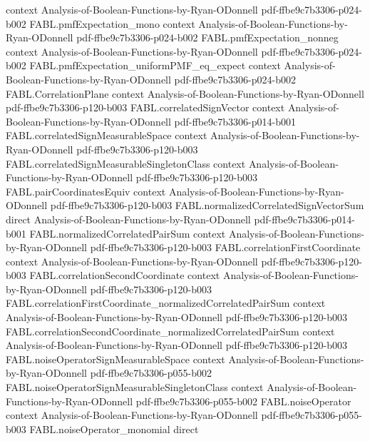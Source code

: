 \begin{theorem}
  {context}
  {Analysis-of-Boolean-Functions-by-Ryan-ODonnell}
  {pdf-ffbe9c7b3306-p024-b002}
\proofstep
  {FABL.pmfExpectation_mono}
  {context}
  {Analysis-of-Boolean-Functions-by-Ryan-ODonnell}
  {pdf-ffbe9c7b3306-p024-b002}
\proofstep
  {FABL.pmfExpectation_nonneg}
  {context}
  {Analysis-of-Boolean-Functions-by-Ryan-ODonnell}
  {pdf-ffbe9c7b3306-p024-b002}
\proofstep
  {FABL.pmfExpectation_uniformPMF_eq_expect}
  {context}
  {Analysis-of-Boolean-Functions-by-Ryan-ODonnell}
  {pdf-ffbe9c7b3306-p024-b002}
\proofstep
  {FABL.CorrelationPlane}
  {context}
  {Analysis-of-Boolean-Functions-by-Ryan-ODonnell}
  {pdf-ffbe9c7b3306-p120-b003}
\proofstep
  {FABL.correlatedSignVector}
  {context}
  {Analysis-of-Boolean-Functions-by-Ryan-ODonnell}
  {pdf-ffbe9c7b3306-p014-b001}
\proofstep
  {FABL.correlatedSignMeasurableSpace}
  {context}
  {Analysis-of-Boolean-Functions-by-Ryan-ODonnell}
  {pdf-ffbe9c7b3306-p120-b003}
\proofstep
  {FABL.correlatedSignMeasurableSingletonClass}
  {context}
  {Analysis-of-Boolean-Functions-by-Ryan-ODonnell}
  {pdf-ffbe9c7b3306-p120-b003}
\proofstep
  {FABL.pairCoordinatesEquiv}
  {context}
  {Analysis-of-Boolean-Functions-by-Ryan-ODonnell}
  {pdf-ffbe9c7b3306-p120-b003}
\proofstep
  {FABL.normalizedCorrelatedSignVectorSum}
  {direct}
  {Analysis-of-Boolean-Functions-by-Ryan-ODonnell}
  {pdf-ffbe9c7b3306-p014-b001}
\proofstep
  {FABL.normalizedCorrelatedPairSum}
  {context}
  {Analysis-of-Boolean-Functions-by-Ryan-ODonnell}
  {pdf-ffbe9c7b3306-p120-b003}
\proofstep
  {FABL.correlationFirstCoordinate}
  {context}
  {Analysis-of-Boolean-Functions-by-Ryan-ODonnell}
  {pdf-ffbe9c7b3306-p120-b003}
\proofstep
  {FABL.correlationSecondCoordinate}
  {context}
  {Analysis-of-Boolean-Functions-by-Ryan-ODonnell}
  {pdf-ffbe9c7b3306-p120-b003}
\proofstep
  {FABL.correlationFirstCoordinate_normalizedCorrelatedPairSum}
  {context}
  {Analysis-of-Boolean-Functions-by-Ryan-ODonnell}
  {pdf-ffbe9c7b3306-p120-b003}
\proofstep
  {FABL.correlationSecondCoordinate_normalizedCorrelatedPairSum}
  {context}
  {Analysis-of-Boolean-Functions-by-Ryan-ODonnell}
  {pdf-ffbe9c7b3306-p120-b003}
\proofstep
  {FABL.noiseOperatorSignMeasurableSpace}
  {context}
  {Analysis-of-Boolean-Functions-by-Ryan-ODonnell}
  {pdf-ffbe9c7b3306-p055-b002}
\proofstep
  {FABL.noiseOperatorSignMeasurableSingletonClass}
  {context}
  {Analysis-of-Boolean-Functions-by-Ryan-ODonnell}
  {pdf-ffbe9c7b3306-p055-b002}
\proofstep
  {FABL.noiseOperator}
  {context}
  {Analysis-of-Boolean-Functions-by-Ryan-ODonnell}
  {pdf-ffbe9c7b3306-p055-b003}
\proofstep
  {FABL.noiseOperator_monomial}
  {direct}

\end{theorem}
